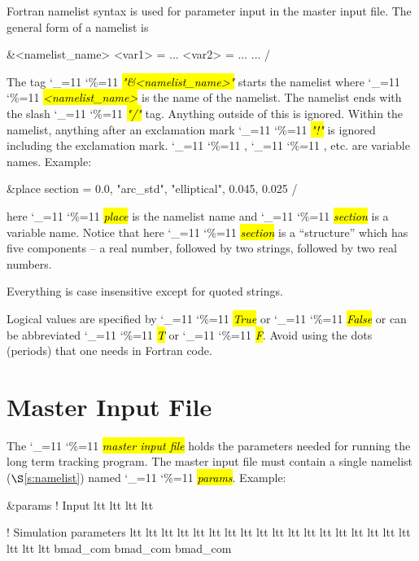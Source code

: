 \documentclass{hitec}
\newcommand\dottcmd[1]{\hl{\em#1}\endgroup}
\newcommand{\vn}{\begingroup\catcode`\_=11 \catcode`\%=11 \dottcmd}
\newcommand{\sref}[1]{$\S$\ref{#1}}
\newcommand{\Section}[1]{\section{#1}\vspace*{-1ex}}
\begin{document}
{{{{{{{{{{{{\begin{code}
{{{{{{{{{{{Fortran namelist syntax is used for parameter input in the master input file. The general form of a
namelist is
\begin{code}
&<namelist_name>
  <var1> = ...
  <var2> = ...
  ...
/
\end{code}
The tag \vn{"\&<namelist_name>"} starts the namelist where
\vn{<namelist_name>} is the name of the namelist. The namelist ends
with the slash \vn{"/"} tag. Anything outside of this is
ignored. Within the namelist, anything after an exclamation mark
\vn{"!"} is ignored including the exclamation mark. \vn{<var1>},
\vn{<var2>}, etc. are variable names. Example:
\begin{code}
&place 
  section = 0.0, "arc_std", "elliptical", 0.045, 0.025 
/
\end{code}
here \vn{place} is the namelist name and \vn{section} is a
variable name.  Notice that here \vn{section} is a ``structure'' which
has five components -- a real number, followed by two strings,
followed by two real numbers.

Everything is case insensitive except for quoted strings.

Logical values are specified by \vn{True} or \vn{False} or can be
abbreviated \vn{T} or \vn{F}. Avoid using the dots (periods) that one
needs in Fortran code.

\Section{Master Input File}
\label{s:input}

The \vn{master input file} holds the parameters needed for running the long term tracking
program. The master input file must contain a single namelist (\sref{s:namelist}) named \vn{params}.
Example:
\begin{code}
&params
  ! Input
  ltt%
  ltt%
  ltt%
  ltt%

  ! Simulation parameters
  ltt%
  ltt%
  ltt%
  ltt%
  ltt%
  ltt%
  ltt%
  ltt%
  ltt%
  ltt%
  ltt%
  ltt%
  ltt%
  ltt%
  ltt%
  ltt%
  ltt%
  ltt%
  ltt%
  ltt%
  ltt%
  bmad_com%
  bmad_com%
  bmad_com%


\end{code}}}}}}}}}}}}
\end{code}}}}}}}}}}}}}
\end{document}
